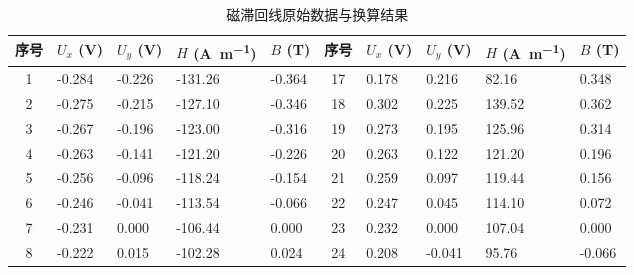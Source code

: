 \documentclass{../template/Report}%
\begin{document}
\begin{fullreportonly}
    \begin{table}[H]
        \centering
        \caption{磁滞回线原始数据与换算结果}
        \label{tab:hysteresis_data}
        \scriptsize
        \setlength{\tabcolsep}{2pt}
        \begin{tabularx}{\textwidth}{cXXXX|cXXXX}
            \toprule
            序号 & $U_x$ (\unit{\volt}) & $U_y$ (\unit{\volt}) & $H$ (\unit{\ampere\per\meter}) & $B$ (\unit{\tesla}) & 序号 & $U_x$ (\unit{\volt}) & $U_y$ (\unit{\volt}) & $H$ (\unit{\ampere\per\meter}) & $B$ (\unit{\tesla}) \\
            \midrule
            1  & -0.284               & -0.226               & -131.26                        & -0.364              & 17 & 0.178                & 0.216                & 82.16                          & 0.348               \\
            2  & -0.275               & -0.215               & -127.10                        & -0.346              & 18 & 0.302                & 0.225                & 139.52                         & 0.362               \\
            3  & -0.267               & -0.196               & -123.00                        & -0.316              & 19 & 0.273                & 0.195                & 125.96                         & 0.314               \\
            4  & -0.263               & -0.141               & -121.20                        & -0.226              & 20 & 0.263                & 0.122                & 121.20                         & 0.196               \\
            5  & -0.256               & -0.096               & -118.24                        & -0.154              & 21 & 0.259                & 0.097                & 119.44                         & 0.156               \\
            6  & -0.246               & -0.041               & -113.54                        & -0.066              & 22 & 0.247                & 0.045                & 114.10                         & 0.072               \\
            7  & -0.231               & 0.000                & -106.44                        & 0.000               & 23 & 0.232                & 0.000                & 107.04                         & 0.000               \\
            8  & -0.222               & 0.015                & -102.28                        & 0.024               & 24 & 0.208                & -0.041               & 95.76                          & -0.066              \\

\end{tabularx}
\end{table}
\end{fullreportonly}
\end{document}
